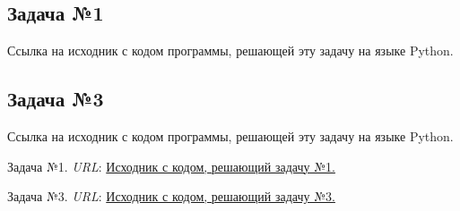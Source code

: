 \documentclass[12pt]{article}
\begin{document}
\subsection*{Задача №1}

Ссылка на исходник с кодом программы, решающей эту задачу на языке Python. \cite{TaskNumber1}

\subsection*{Задача №3}
Ссылка на исходник с кодом программы, решающей эту задачу на языке Python. \cite{TaskNumber3}
\newpage

\begin{thebibliography}{99}
    Задача №1. \textit{URL}: \href{https://colab.research.google.com/drive/10P1FfFSNAT1sFofKclQP3D2H63IfjJ5n#scrollTo=sdMVrQmwrOrM}{Исходник с кодом, решающий задачу №1.}
    
    Задача №3. \textit{URL}:
\href{https://colab.research.google.com/drive/1oKAvJfOlzvyp6hB6qVOLeUKA08yHvjOA?usp=sharing#scrollTo=IJjFoXfdsgKB}{Исходник с кодом, решающий задачу №3.}
\end{thebibliography}
\end{document}
